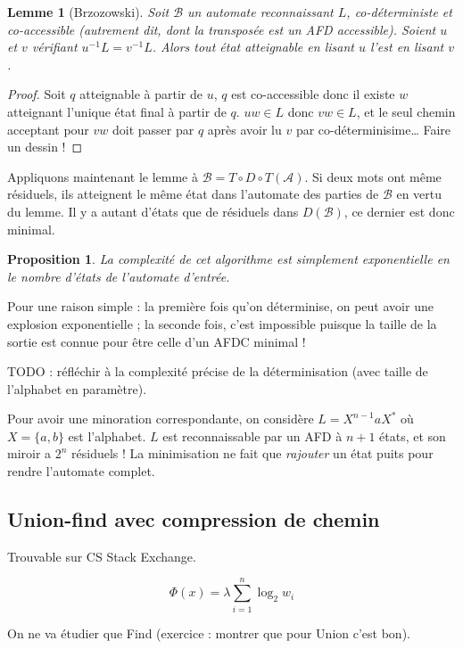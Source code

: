 \documentclass[a4paper, 11pt]{article}
\newtheorem*{proposition}{Proposition}
\newtheorem*{lemma}{Lemme}
\begin{document}
\begin{lemma}[Brzozowski]
  Soit $\mathcal{B}$ un automate reconnaissant $L$, \emph{co-déterministe} et
  \emph{co-accessible} (autrement dit, dont la transposée est un AFD
  accessible). Soient $u$ et $v$ vérifiant $u^{-1}L = v^{-1}L$. Alors tout état
  atteignable en lisant $u$ l'est en lisant $v$.
\end{lemma}
\begin{proof}
  Soit $q$ atteignable à partir de $u$, $q$ est co-accessible donc il existe $w$
  atteignant l'unique état final à partir de $q$. $uw \in L$ donc $vw \in L$, et
  le seul chemin acceptant pour $vw$ doit passer par $q$ après avoir lu $v$ par
  co-déterminisime… Faire un dessin !
\end{proof}

Appliquons maintenant le lemme à $\mathcal{B} = T \circ D \circ T(\mathcal{A})$.
Si deux mots ont même résiduels, ils atteignent le même état dans l'automate des
parties de $\mathcal{B}$ en vertu du lemme. Il y a autant d'états que de
résiduels dans $D(\mathcal{B})$, ce dernier est donc minimal.

\begin{proposition}
  La complexité de cet algorithme est simplement exponentielle en le nombre
  d'états de l'automate d'entrée.
\end{proposition}

Pour une raison simple : la première fois qu'on déterminise, on peut avoir une
explosion exponentielle ; la seconde fois, c'est impossible puisque la taille de
la sortie est connue pour être celle d'un AFDC minimal !

TODO : réfléchir à la complexité précise de la déterminisation (avec taille de
l'alphabet en paramètre).

Pour avoir une minoration correspondante, on considère $L = X^{n-1}aX^*$ où $X =
\{a,b\}$ est l'alphabet. $L$ est reconnaissable par un AFD à $n+1$ états, et son
miroir a $2^n$ résiduels ! La minimisation ne fait que \emph{rajouter} un état
puits pour rendre l'automate complet.

\subsection{Union-find avec compression de chemin}

Trouvable sur CS Stack Exchange.

\[ \Phi(x) = \lambda \sum_{i=1}^n \log_2 w_i \]

On ne va étudier que Find (exercice : montrer que pour Union c'est bon).
\end{document}
